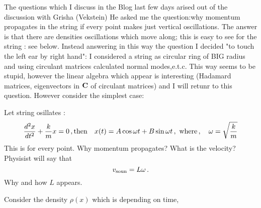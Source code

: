 

\baselineskip=14pt
\def\vare {\varepsilon}
\def\t {\tilde}
\def\a {\alpha}
\def\K {{\bf K}}
\def\N {{\bf N}}
\def\C {{\cal C}}
\def\L {{\cal L}}
\def\E {{\cal E}}
\def\s {{\sigma}}
\def\S {{\Sigma}}
\def\p{\partial}
\def\vare{{\varepsilon}}
\def\Q {{\bf Q}}
\def\D {{\cal D}}
\def\G {{\Gamma}}
\def\Z {{\bf Z}}
\def\R  {{\bf R}}
\def\l {\lambda}
\def\ll {{\bf l}}
\def\degree {{\bf {\rm degree}\,\,}}
\def \finish {${\,\,\vrule height1mm depth2mm width 8pt}$}
\def \m {\medskip}
\def\p {\partial}
\def\r {{\bf r}}
\def\pt {{\bf p}}
\def\v {{\bf v}}
\def\n {{\bf n}}
\def\t {{\bf t}}
\def\b {{\bf b}}
\def\c {{\bf c }}
\def\e{{\bf e}}
\def\f{{\bf f}}
\def\ac {{\bf a}}
\def \X   {{\bf X}}
\def \Y   {{\bf Y}}
\def \x   {{\bf x}}
\def \y   {{\bf y}}
\def\w {{\omega}}
\def \Tr  {{\rm Tr\,}}
\def\dim {{\rm dim\,\,}}
\def\t {{\tilde}} 
\def\dist {{\hbox{\tt "distance"}}}

The questions which I discuss in the Blog last few days arised out
of the discussion with Grisha (Vekstein)  He asked me the question:why momentum propagates in the string if every point makes just vertical oscillations.
The answer is that  there are densities oscillations which move along; this is easy to see for the string : see below. Instead answering in this way the 
question  I decided "to touch the left ear by right hand": I considered
a string as circular  ring of BIG radius and using circulant matrices
  calculated normal modes,e.t.c.  This way seems to be stupid,
however the linear algebra which appear is interesting (Hadamard matrices,
 eigenvectors in $\bf C$ of circulant matrices) and I will retunr to this 
question.  However consider the simplest case:

 Let  string osillates :
                 $$
     {d^2x\over dt^2}+{k\over m}x=0\,, {\rm then}\quad
                 x(t)=A\cos \w t+B\sin \w t\,,\,\,{\rm where}\,,\quad
               \w=\sqrt {k\over m}
                 $$
This is for every point.
Why momentum propagates?  What is the velocity? Physisist will say that
                $$
             v_{\rm soun}=L\w\,.
                         $$
Why and how $L$ appears.

  Consider the density $\rho(x)$ which is depending on time,
\bye
